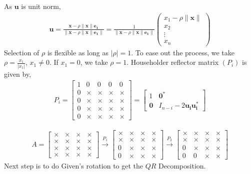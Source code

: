 \documentclass{beamer}
\providecommand{\brak}[1]{\ensuremath{\left(#1\right)}}
\theoremstyle{remark}
\providecommand{\abs}[1]{\left\vert#1\right\vert}
\providecommand{\norm}[1]{\lVert#1\rVert}
\let\vec\mathbf
\numberwithin{equation}{section}
\begin{document}
\begin{frame}
As $\vec{u}$ is unit norm,
\begin{align}
  \vec{u} = \frac{\vec{x} - \rho\norm{\vec{x}}\vec{e_1}}{\norm{\vec{x} - \rho\norm{\vec{x}}\vec{e_1}}} = \frac{1}{\norm{\vec{x} - \rho\norm{\vec{x}}\vec{e_1}}} \begin{pmatrix} x_1 - \rho\norm{\vec{x}}\\x_2\\\vdots\\x_n\end{pmatrix}
\end{align}
Selection of $\rho$ is flexible as long as $\abs{\rho} = 1$. To ease out the process, we take $\rho = \frac{x_1}{\abs{x_1}}$, $x_1 \neq 0$. If $x_1 = 0$, we take $\rho = 1$.
\newline
Householder reflector matrix $\brak{P_{i}}$ is given by,
\begin{align}
  P_{i} = \begin{bmatrix}
    1 & 0 & 0 & 0 & 0\\    
    0 & \times & \times & \times & \times\\
    0 & \times & \times & \times & \times\\
    0 & \times & \times & \times & \times\\
    0 & \times & \times & \times & \times
  \end{bmatrix} = \begin{bmatrix}
    1 & \vec{0}^{\ast}\\    
    \vec{0} & I_{n - i} - 2\vec{u_{i}}\vec{u_{i}^{\ast}}
  \end{bmatrix}
\end{align}
\end{frame}

\begin{frame}
\begin{align}
A = 
\begin{bmatrix}
\times & \times & \times & \times \\
\times & \times & \times & \times \\
\times & \times & \times & \times \\
\times & \times & \times & \times
\end{bmatrix}
\xrightarrow{P_1}
\begin{bmatrix}
\times & \times & \times & \times \\
\times & \times & \times & \times \\
0 & \times & \times & \times \\
0 & \times & \times & \times
\end{bmatrix}
\xrightarrow{P_2}
\begin{bmatrix}
\times & \times & \times & \times \\
\times & \times & \times & \times \\
0 & \times & \times & \times \\
0 & 0 & \times & \times
\end{bmatrix}
\end{align}
Next step is to do Given's rotation to get the $QR$ Decomposition.
\end{frame}
\end{document}
